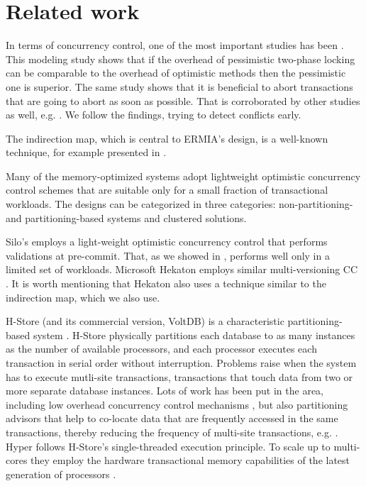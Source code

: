 
\section{Related work}

In terms of concurrency control, one of the most important studies has been \cite{AgrawalCL87}. This modeling study shows that if the overhead of pessimistic two-phase locking can be comparable to the overhead of optimistic methods then the pessimistic one is superior. The same study shows that it is beneficial to abort transactions that are going to abort as soon as possible. That is corroborated by other studies as well, e.g. \cite{PortsG12}. We follow the findings, trying to detect conflicts early.
 
The indirection map, which is central to ERMIA's design, is a well-known technique, for example presented in \cite{SadoghiRCB13}.

Many of the memory-optimized systems adopt lightweight optimistic concurrency control schemes that are suitable only for a small fraction of transactional workloads.
The designs can be categorized in three categories: non-partitioning- and partitioning-based systems and clustered solutions. 

Silo's  \cite{TuZKLM13} employs a light-weight optimistic concurrency control that performs validations at pre-commit. That, as we showed in , performs well only in a limited set of workloads. 
Microsoft Hekaton \cite{Diaconu+13} employs similar multi-versioning CC \cite{LarsonBDFPZ11}. It is worth mentioning that Hekaton also uses a technique similar to the indirection map, which we also use. 

H-Store (and its commercial version, VoltDB) is a characteristic partitioning-based system \cite{Kallman+08}. H-Store physically partitions each database to as many instances as the number of available processors, and each processor executes each transaction in serial order without interruption.  
Problems raise when the system has to execute mutli-site transactions, transactions that touch data from two or more separate database instances. Lots of work has been put in the area, including low overhead concurrency control mechanisms \cite{JonesAM10}, but also partitioning advisors that help to co-locate data that are frequently accessed in the same transactions, thereby reducing the frequency of multi-site transactions, e.g. \cite{CurinoJZM10,PavloJZ11,TranNST14}.
Hyper \cite{KemperN11} follows H-Store's single-threaded execution principle.  To scale up to multi-cores they employ the hardware transactional memory capabilities of the latest generation of processors \cite{LeisKN14}. 

